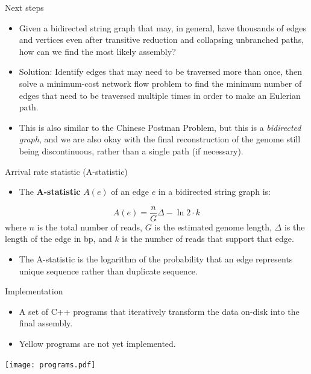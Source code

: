 \documentclass[xcolor=dvipsnames]{beamer}
\begin{document}
\begin{frame}{Next steps}
	\begin{itemize}
		\item Given a bidirected string graph that may, in general, have
		thousands of edges and vertices even after transitive reduction and
		collapsing unbranched paths, how can we find the most likely assembly?
		\item Solution: Identify edges that may need to be traversed more than
		once, then solve a minimum-cost network flow problem to find the minimum
		number of edges that need to be traversed multiple times in order to
		make an Eulerian path.
		\item This is also similar to the Chinese Postman Problem, but this is a
		{\it bidirected graph}, and we are also okay with the final
		reconstruction of the genome still being discontinuous, rather than a
		single path (if necessary).
	\end{itemize}
\end{frame}

\begin{frame}{Arrival rate statistic (A-statistic)}
	\begin{itemize}
		\item The {\bf A-statistic} $A(e)$ of an edge $e$ in a
		bidirected string graph is:
	\end{itemize}
	\[ A(e) = \frac{n}{G} \Delta - \ln{2} \cdot {k} \]
	where $n$ is the total number of reads, $G$ is the estimated genome
	length, $\Delta$ is the length of the edge in bp, and $k$ is the number
	of reads that support that edge.
	\begin{itemize}
		\item The A-statistic is the logarithm of the probability that
		an edge represents unique sequence rather than duplicate
		sequence.
	\end{itemize}
\end{frame}

\begin{frame}{Implementation}
	\begin{minipage}{0.3\textwidth}
		\begin{itemize}
			\item A set of C++ programs that iteratively transform
			the data on-disk into the final assembly.
			\item Yellow programs are not yet implemented.
		\end{itemize}
	\end{minipage}
	\begin{minipage}{0.67\textwidth}
		\texttt{[image: programs.pdf]}
	\end{minipage}
\end{frame}
\end{document}
